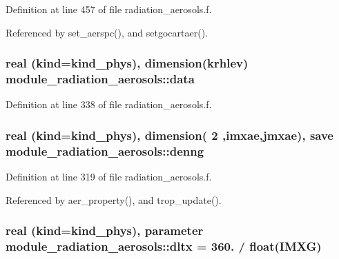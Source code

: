 Definition at line 457 of file radiation\+\_\+aerosols.\+f.



Referenced by set\+\_\+aerspc(), and setgocartaer().

\subsubsection[{\texorpdfstring{data}{data}}]{\setlength{\rightskip}{0pt plus 5cm}real (kind=kind\+\_\+phys), dimension(krhlev) module\+\_\+radiation\+\_\+aerosols\+::data\hspace{0.3cm}{\ttfamily [private]}}\hypertarget{group__module__radiation__aerosols_ga1248e740e53498ed7a06f7d475b1fb25}{}\label{group__module__radiation__aerosols_ga1248e740e53498ed7a06f7d475b1fb25}


Definition at line 338 of file radiation\+\_\+aerosols.\+f.

\subsubsection[{\texorpdfstring{denng}{denng}}]{\setlength{\rightskip}{0pt plus 5cm}real (kind=kind\+\_\+phys), dimension( 2 ,imxae,jmxae), save module\+\_\+radiation\+\_\+aerosols\+::denng\hspace{0.3cm}{\ttfamily [private]}}\hypertarget{group__module__radiation__aerosols_ga0ccc698bc870cb6ccbc1c2b64a3f45f6}{}\label{group__module__radiation__aerosols_ga0ccc698bc870cb6ccbc1c2b64a3f45f6}


Definition at line 319 of file radiation\+\_\+aerosols.\+f.



Referenced by aer\+\_\+property(), and trop\+\_\+update().

\subsubsection[{\texorpdfstring{dltx}{dltx}}]{\setlength{\rightskip}{0pt plus 5cm}real (kind=kind\+\_\+phys), parameter module\+\_\+radiation\+\_\+aerosols\+::dltx = 360. / float(I\+M\+XG)\hspace{0.3cm}{\ttfamily [private]}}\hypertarget{group__module__radiation__aerosols_ga084315fde4afcad23cd3aeb18a4d8a4e}{}\label{group__module__radiation__aerosols_ga084315fde4afcad23cd3aeb18a4d8a4e}


